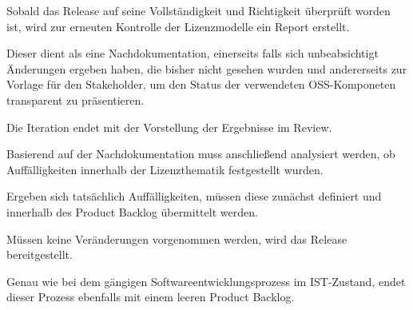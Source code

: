 Sobald das Release auf seine Vollständigkeit und Richtigkeit überprüft worden ist, wird zur erneuten Kontrolle der Lizenzmodelle ein Report erstellt. 

Dieser dient als eine Nachdokumentation, einerseits falls sich unbeabsichtigt Änderungen ergeben haben, die bisher nicht gesehen wurden und andererseits zur Vorlage für den Stakeholder, um den Status der verwendeten OSS-Komponeten transparent zu präsentieren. 

Die Iteration endet mit der Vorstellung der Ergebnisse im Review. 

Basierend auf der Nachdokumentation muss anschließend analysiert werden, ob Auffälligkeiten innerhalb der Lizenzthematik festgestellt wurden.  

Ergeben sich tatsächlich Auffälligkeiten, müssen diese zunächst definiert und innerhalb des Product Backlog übermittelt werden. 

Müssen keine Veränderungen vorgenommen werden, wird das Release bereitgestellt. 

Genau wie bei dem gängigen Softwareentwicklungsprozess im IST-Zustand, endet dieser Prozess ebenfalls mit einem leeren Product Backlog.  

















